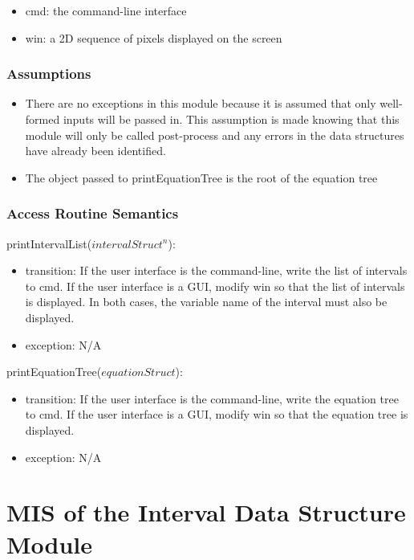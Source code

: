 \documentclass[12pt, titlepage]{article}
\begin{document}
\begin{itemize}
	\item cmd: the command-line interface
	\item win: a 2D sequence of pixels displayed on the screen
\end{itemize}

\subsubsection{Assumptions}

\begin{itemize}
	\item There are no exceptions in this module because it is assumed that 
	only well-formed inputs will be passed in. This assumption is made knowing 
	that this module will only be called post-process and any errors in the 
	data structures have already been identified.
	\item The object passed to printEquationTree is the root of the equation 
	tree
\end{itemize}


\subsubsection{Access Routine Semantics}

\noindent printIntervalList($intervalStruct^n$):
\begin{itemize}
	\item transition: If the user interface is the command-line, write the list 
	of intervals to cmd. If the user interface is a GUI, modify win so that the 
	list of intervals is displayed. In both cases, the variable name of the 
	interval must also be displayed.
	\item exception: N/A
\end{itemize}

\noindent printEquationTree($equationStruct$):
\begin{itemize}
	\item transition: If the user interface is the command-line, write the 
	equation tree to cmd. If the user interface is a GUI, modify win so that 
	the equation tree is displayed.
	\item exception: N/A
\end{itemize}

\newpage

\section{MIS of the Interval Data Structure Module} 
\label{Module_intervaldatastructure}
\end{document}
